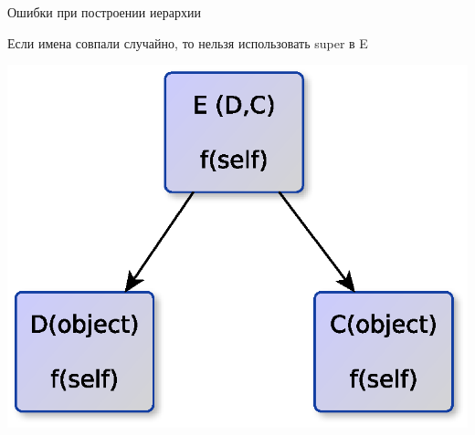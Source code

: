 \documentclass{article}
\begin{document}
\begin{center}Ошибки при построении иерархии\end{center}
Если имена совпали случайно, то нельзя использовать super в E \\
\begin{center} \includegraphics[scale=0.9]{images/missed_base_class.eps} \end{center}
\newpage
\end{document}
